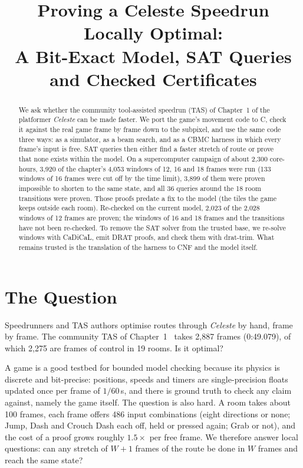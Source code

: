 \documentclass[conference]{IEEEtran}
\begin{document}
\title{Proving a Celeste Speedrun Locally Optimal:\\
A Bit-Exact Model, SAT Queries and Checked Certificates}

\author{
}

\maketitle

\begin{abstract}
We ask whether the community tool-assisted speedrun (TAS) of Chapter~1 of the
platformer \emph{Celeste} can be made faster. We port the game's movement
code to C, check it against the real game frame by frame down to the
subpixel, and use the same code three ways: as a simulator, as a beam
search, and as a CBMC harness in which every frame's input is free. SAT
queries then either find a faster stretch of route or prove that none exists
within the model. On a supercomputer campaign of about 2,300 core-hours,
3,920 of the chapter's 4,053 windows of 12, 16 and 18 frames were run (133
windows of 16 frames were cut off by the time limit), 3,899 of them were proven
impossible to shorten to the same state, and all 36 queries around the 18 room
transitions were proven. Those proofs predate a fix to the model (the tiles the
game keeps outside each room). Re-checked on the current model, 2,023 of the
2,028 windows of 12 frames are proven; the windows of 16 and 18 frames and the
transitions have not been re-checked. To remove the SAT solver from the trusted base, we
re-solve windows with CaDiCaL, emit DRAT proofs, and check them with
drat-trim. What remains trusted is the translation of the harness to CNF and the model itself.
\end{abstract}

\section{The Question}
Speedrunners and TAS authors optimise routes through \emph{Celeste} by hand,
frame by frame. The community TAS of Chapter~1~\cite{celestetas} takes 2,887
frames (0:49.079), of which 2,275 are frames of control in 19 rooms. Is it
optimal?

A game is a good testbed for bounded model checking because its physics is
discrete and bit-precise: positions, speeds and timers are single-precision
floats updated once per frame of $1/60$\,s, and there is ground truth to
check any claim against, namely the game itself. The question is also hard. A room
takes about 100 frames, each frame offers 486 input combinations (eight
directions or none; Jump, Dash and Crouch Dash each off, held or pressed
again; Grab or not), and the cost of a proof grows roughly $1.5\times$ per
free frame. We therefore
answer local questions: can any stretch of $W{+}1$ frames of the route be
done in $W$ frames and reach the same state?
\end{document}
